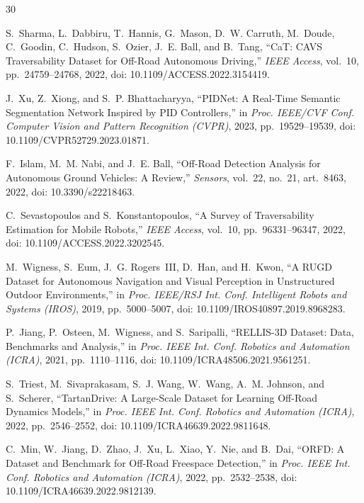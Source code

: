 \clearpage
{}
{}

\begin{thebibliography}{30}

S.~Sharma, L.~Dabbiru, T.~Hannis, G.~Mason, D.~W. Carruth, M.~Doude,
C.~Goodin, C.~Hudson, S.~Ozier, J.~E. Ball, and B.~Tang,
``CaT: CAVS Traversability Dataset for Off-Road Autonomous Driving,''
\emph{IEEE Access}, vol.~10, pp.~24759--24768, 2022,
doi: 10.1109/ACCESS.2022.3154419.

J.~Xu, Z.~Xiong, and S.~P. Bhattacharyya,
``PIDNet: A Real-Time Semantic Segmentation Network Inspired by PID
Controllers,'' in \emph{Proc. IEEE/CVF Conf. Computer Vision and Pattern
Recognition (CVPR)}, 2023, pp.~19529--19539,
doi: 10.1109/CVPR52729.2023.01871.

F.~Islam, M.~M. Nabi, and J.~E. Ball,
``Off-Road Detection Analysis for Autonomous Ground Vehicles: A Review,''
\emph{Sensors}, vol.~22, no.~21, art.~8463, 2022,
doi: 10.3390/s22218463.

C.~Sevastopoulos and S.~Konstantopoulos,
``A Survey of Traversability Estimation for Mobile Robots,''
\emph{IEEE Access}, vol.~10, pp.~96331--96347, 2022,
doi: 10.1109/ACCESS.2022.3202545.

M.~Wigness, S.~Eum, J.~G. Rogers~III, D.~Han, and H.~Kwon,
``A RUGD Dataset for Autonomous Navigation and Visual Perception in
Unstructured Outdoor Environments,'' in \emph{Proc. IEEE/RSJ Int. Conf.
Intelligent Robots and Systems (IROS)}, 2019, pp.~5000--5007,
doi: 10.1109/IROS40897.2019.8968283.

P.~Jiang, P.~Osteen, M.~Wigness, and S.~Saripalli,
``RELLIS-3D Dataset: Data, Benchmarks and Analysis,''
in \emph{Proc. IEEE Int. Conf. Robotics and Automation (ICRA)}, 2021,
pp.~1110--1116, doi: 10.1109/ICRA48506.2021.9561251.

S.~Triest, M.~Sivaprakasam, S.~J. Wang, W.~Wang, A.~M. Johnson, and S.~Scherer,
``TartanDrive: A Large-Scale Dataset for Learning Off-Road Dynamics Models,''
in \emph{Proc. IEEE Int. Conf. Robotics and Automation (ICRA)}, 2022,
pp.~2546--2552, doi: 10.1109/ICRA46639.2022.9811648.

C.~Min, W.~Jiang, D.~Zhao, J.~Xu, L.~Xiao, Y.~Nie, and B.~Dai,
``ORFD: A Dataset and Benchmark for Off-Road Freespace Detection,''
in \emph{Proc. IEEE Int. Conf. Robotics and Automation (ICRA)}, 2022,
pp.~2532--2538, doi: 10.1109/ICRA46639.2022.9812139.


\end{thebibliography}

